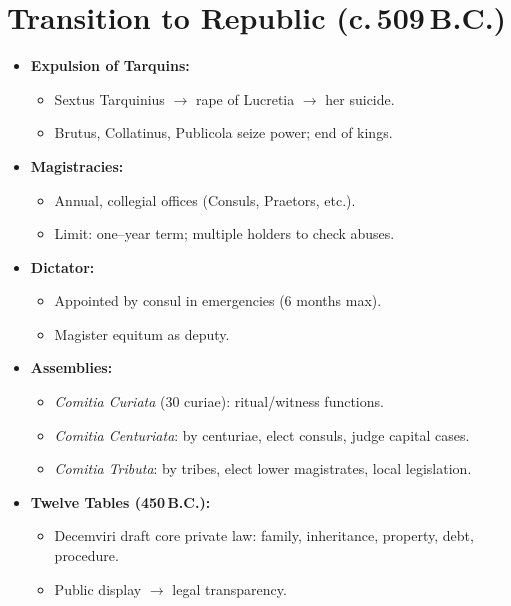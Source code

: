 \documentclass[11pt,a4paper]{article}
\begin{document}
\section{Transition to Republic (c.\,509\,B.C.)}
\begin{itemize}
  \item \textbf{Expulsion of Tarquins:}
    \begin{itemize}
      \item Sextus Tarquinius \(\to\) rape of Lucretia \(\to\) her suicide.
      \item Brutus, Collatinus, Publicola seize power; end of kings.
    \end{itemize}
  \item \textbf{Magistracies:}
    \begin{itemize}
      \item Annual, collegial offices (Consuls, Praetors, etc.).
      \item Limit: one–year term; multiple holders to check abuses.
    \end{itemize}
  \item \textbf{Dictator:}
    \begin{itemize}
      \item Appointed by consul in emergencies (6 months max).
      \item Magister equitum as deputy.
    \end{itemize}
  \item \textbf{Assemblies:}
    \begin{itemize}
      \item \textit{Comitia Curiata} (30 curiae): ritual/witness functions.
      \item \textit{Comitia Centuriata}: by centuriae, elect consuls, judge capital cases.
      \item \textit{Comitia Tributa}: by tribes, elect lower magistrates, local legislation.
    \end{itemize}
  \item \textbf{Twelve Tables (450\,B.C.):}
    \begin{itemize}
      \item Decemviri draft core private law: family, inheritance, property, debt, procedure.
      \item Public display \(\to\) legal transparency.
    \end{itemize}
\end{itemize}
\end{document}
